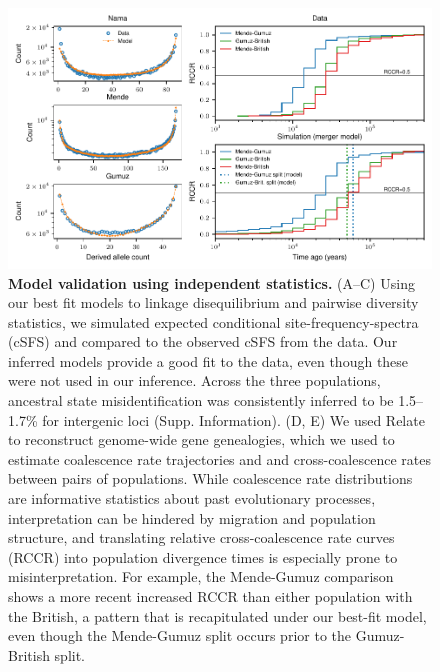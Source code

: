 \documentclass[]{article}
\begin{document}
\begin{figure}[t!]
    \centering
    \includegraphics{figures/validation}
    \caption{
        \textbf{Model validation using independent statistics.} (A--C) Using
        our best fit models to linkage disequilibrium and pairwise diversity statistics,
        we simulated expected conditional site-frequency-spectra (cSFS) and
        compared to the observed cSFS from the data. Our inferred models
        provide a good fit to the data, even though these were not used in our
        inference. Across the three populations, ancestral state
        misidentification was consistently inferred to be 1.5--1.7\% for
        intergenic loci (Supp. Information). (D, E) We used Relate
        \citep{Speidel2019-nj} to reconstruct genome-wide gene genealogies,
        which we used to estimate coalescence rate trajectories and
        and cross-coalescence rates between pairs of populations. While
        coalescence rate distributions are informative statistics about past
        evolutionary processes, interpretation can be hindered by migration and
        population structure, and translating relative cross-coalescence rate
        curves (RCCR) into population divergence times is especially prone
        to misinterpretation. For example, the Mende-Gumuz comparison shows
        a more recent increased RCCR than either population with the British,
        a pattern that is recapitulated under our best-fit model, even though
        the Mende-Gumuz split occurs prior to the Gumuz-British split.
    }
    \label{fig:validation}
\end{figure}
\end{document}
